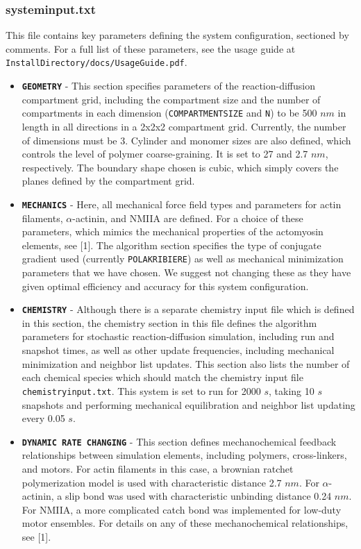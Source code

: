 \documentclass[11pt, oneside]{article}   	%
\begin{document}
\subsubsection{systeminput.txt}

This file contains key parameters defining the system configuration, sectioned by comments. For a full list of these parameters, see the usage guide at \texttt{InstallDirectory/docs/UsageGuide.pdf}.

\begin{itemize}
\item \texttt{\textbf{GEOMETRY}} - This section specifies parameters of the reaction-diffusion compartment grid, including the compartment size and the number of compartments in each dimension (\texttt{COMPARTMENTSIZE} and \texttt{N}) to be 500 $nm$ in length in all directions in a 2x2x2 compartment grid. Currently, the number of dimensions must be 3. Cylinder and monomer sizes are also defined, which controls the level of polymer coarse-graining. It is set to 27 and 2.7 $nm$, respectively. The boundary shape chosen is cubic, which simply covers the planes defined by the compartment grid.

\item \texttt{\textbf{MECHANICS}} - Here, all mechanical force field types and parameters for actin filaments, $\alpha$-actinin, and NMIIA are defined. For a choice of these parameters, which mimics the mechanical properties of the actomyosin elements, see [1]. The algorithm section specifies the type of conjugate gradient used (currently \texttt{POLAKRIBIERE}) as well as mechanical minimization parameters that we have chosen. We suggest not changing these as they have given optimal efficiency and accuracy for this system configuration.

\item \texttt{\textbf{CHEMISTRY}} - Although there is a separate chemistry input file which is defined in this section, the chemistry section in this file defines the algorithm parameters for stochastic reaction-diffusion simulation, including run and snapshot times, as well as other update frequencies, including mechanical minimization and neighbor list updates. This section also lists the number of each chemical species which should match the chemistry input file \texttt{chemistryinput.txt}. This system is set to run for 2000 $s$, taking 10 $s$ snapshots and performing mechanical equilibration and neighbor list updating every 0.05 $s$.

\item \texttt{\textbf{DYNAMIC RATE CHANGING}} - This section defines mechanochemical feedback relationships between simulation elements, including polymers, cross-linkers, and motors. For actin filaments in this case, a brownian ratchet polymerization model is used with characteristic distance 2.7 $nm$. For $\alpha$-actinin, a slip bond was used with characteristic unbinding distance 0.24 $nm$. For NMIIA, a more complicated catch bond was implemented for low-duty motor ensembles. For details on any of these mechanochemical relationships, see [1].


\end{itemize}
\end{document}
